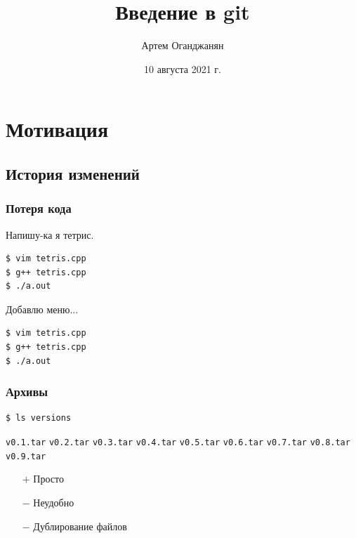 \documentclass[pdf,russian]{beamer}
\title{Введение в git}
\author{Артем Оганджанян}
\institute{ЛОЛ-2021}
\date{10 августа 2021 г.}
\begin{document}

\begin{frame}
    \titlepage
\end{frame}

\section{Мотивация}

\subsection{История изменений}

\begin{frame}[fragile]
    \frametitle{Потеря кода}
    \pause
    Напишу-ка я тетрис.
    \begin{block}{}
        \begin{verbatim}
$ vim tetris.cpp
$ g++ tetris.cpp
$ ./a.out
        \end{verbatim}
    \end{block}
    \pause
    Добавлю меню...
    \begin{block}{}
        \begin{verbatim}
$ vim tetris.cpp
$ g++ tetris.cpp
$ ./a.out
        \end{verbatim}
    \end{block}
    \pause
\end{frame}

\begin{frame}[fragile]
    \frametitle{Архивы}
    \begin{block}{}
        \begin{verbatim}
$ ls versions
        \end{verbatim}
        \texttt{\textcolor[HTML]{aa0000}{v0.1.tar}} \quad
        \texttt{\textcolor[HTML]{aa0000}{v0.2.tar}} \quad
        \pause
        \texttt{\textcolor[HTML]{aa0000}{v0.3.tar}} \quad
        \texttt{\textcolor[HTML]{aa0000}{v0.4.tar}} \quad
        \texttt{\textcolor[HTML]{aa0000}{v0.5.tar}} \quad
        \texttt{\textcolor[HTML]{aa0000}{v0.6.tar}} \quad
        \texttt{\textcolor[HTML]{aa0000}{v0.7.tar}} \quad
        \texttt{\textcolor[HTML]{aa0000}{v0.8.tar}} \quad
        \texttt{\textcolor[HTML]{aa0000}{v0.9.tar}}
    \end{block}
    \begin{itemize}
        \pause
        \item[$+$] Просто
        \pause
        \item[$-$] Неудобно
        \pause
        \item[$-$] Дублирование файлов
    \end{itemize}
\end{frame}
\end{document}
